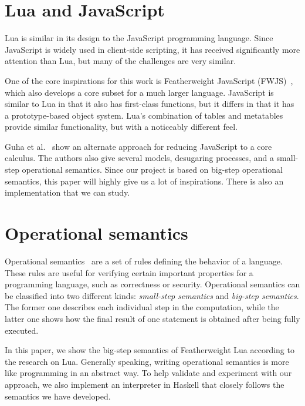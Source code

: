 \section{Lua and JavaScript}
Lua is similar in its design to the JavaScript programming language.
Since JavaScript is widely used in client-side scripting,
it has received significantly more attention than Lua,
but many of the challenges are very similar.

One of the core inspirations for this work is Featherweight JavaScript (FWJS)~\cite{FWJS},
which also develops a core subset for a much larger language.
JavaScript is similar to Lua in that it also has first-class functions,
but it differs in that it has a prototype-based object system.
Lua's combination of tables and metatables provide similar functionality,
but with a noticeably different feel.

Guha et al.~\cite{EOJS} show an alternate approach for reducing JavaScript to a core calculus. The authors also give several models, desugaring processes, and a small-step operational semantics. Since our project is based on big-step operational semantics, this paper will highly give us a lot of inspirations. There is also an implementation that we can study.

\section{Operational semantics}
Operational semantics~\cite{AIOS} are a set of rules defining the behavior of a language.
These rules are useful for verifying certain important properties for a programming language, such as correctness or security.
Operational semantics can be classified into two different kinds: \emph{small-step semantics} and \emph{big-step semantics}. The former one describes each individual step in the computation, while the latter one shows how the final result of one statement is obtained after being fully executed.

In this paper, we show the big-step semantics of Featherweight Lua according to the research on Lua. Generally speaking, writing operational semantics is more like programming in an abstract way. To help validate and experiment with our approach, we also implement an interpreter in Haskell that closely follows the semantics we have developed.

